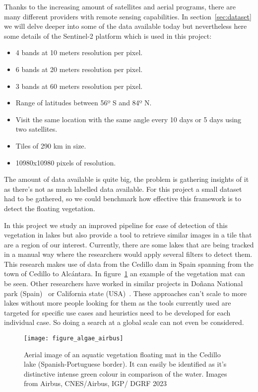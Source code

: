 \documentclass[conference]{IEEEtran}
\begin{document}
    Thanks to the increasing amount of satellites and aerial programs, there are many different providers with remote sensing capabilities.
    In section~\ref{sec:dataset} we will delve deeper into some of the data available today but nevertheless here some details of the Sentinel-2 platform
    which is used in this project:
    \begin{itemize}
        \item 4 bands at 10 meters resolution per pixel.
        \item 6 bands at 20 meters resolution per pixel.
        \item 3 bands at 60 meters resolution per pixel.
        \item Range of latitudes between 56º S and 84º N.
        \item Visit the same location with the same angle every 10 days or 5 days using two satellites.
        \item Tiles of 290 km in size.
        \item 10980x10980 pixels of resolution.
    \end{itemize}
    The amount of data available is quite big, the problem is gathering insights of it as there's not as much labelled data
    available.
    For this project a small dataset had to be gathered, so we could benchmark how effective this framework is to detect the
    floating vegetation.

    In this project we study an improved pipeline for ease of detection of this vegetation in lakes but also provide a tool
    to retrieve similar images in a tile that are a region of our interest.
    Currently, there are some lakes that are being tracked in a manual way where the researchers would apply several filters to detect them.
    This research makes use of data from the Cedillo dam in Spain spanning from the town of Cedillo to Alcántara.
    In figure~\ref{fig:satellite-image-airbus} an example of the vegetation mat can be seen.
    Other researchers have worked in similar projects in Doñana National park (Spain)~\cite{donyana1, donyana2} or California state (USA)~\cite{rs14133013}.
    These approaches can't scale to more lakes without more people looking for them as the tools currently used are targeted
    for specific use cases and heuristics need to be developed for each individual case.
    So doing a search at a global scale can not even be considered.

    \begin{figure}[h]
        \centering
        \texttt{[image: figure\_algae\_airbus]}
        \caption{Aerial image of an aquatic vegetation floating mat in the Cedillo lake (Spanish-Portuguese border). It can easily be identified as it's distinctive
        intense green colour in comparison of the water. Images from Airbus, CNES/Airbus, IGP/ DGRF 2023}
        \label{fig:satellite-image-airbus}
    \end{figure}
\end{document}
